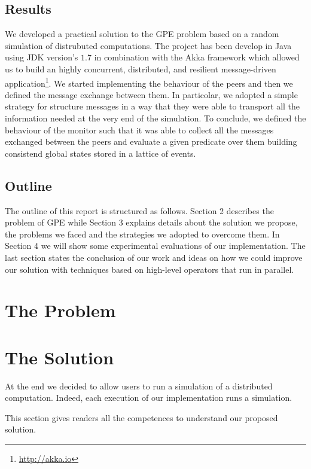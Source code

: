 \documentclass[12pt]{article}
\begin{document}
\subsection*{Results}

We developed a practical solution to the GPE problem based on a random simulation of distrubuted computations. The project has been develop in Java using JDK version's $1.7$ in combination with the Akka framework which allowed us to build an highly concurrent, distributed, and resilient message-driven application\footnote{\url{http://akka.io}}. We started implementing the behaviour of the peers and then we defined the message exchange between them. In particolar, we adopted a simple strategy for structure messages in a way that they were able to transport all the information needed at the very end of the simulation. To conclude, we defined the behaviour of the monitor such that it was able to collect all the messages exchanged between the peers and evaluate a given predicate over them building consistend global states stored in a lattice of events.

\subsection*{Outline}

The outline of this report is structured as follows. Section 2 describes the problem of GPE while Section 3 explains details about the solution we propose, the problems we faced and the strategies we adopted to overcome them. In Section 4 we will show some experimental evaluations of our implementation. The last section states the conclusion of our work and ideas on how we could improve our solution with techniques based on high-level operators that run in parallel.

\section{The Problem}

\section{The Solution}


At the end we decided to allow users to run a simulation of a distributed computation. Indeed, each execution of our implementation runs a simulation.

This section  gives readers all the competences to understand our proposed solution.
\end{document}
